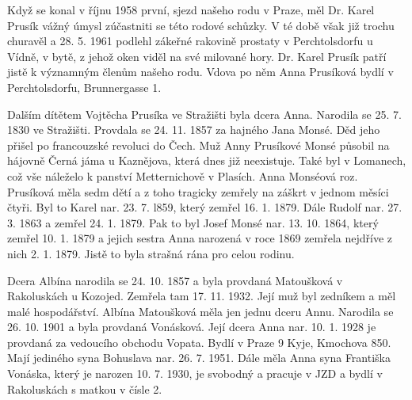 \documentclass[../dejiny-rodu-prusiku.tex]{subfiles}
\begin{document}
Když se konal v říjnu 1958 první, sjezd našeho rodu v Praze, měl Dr. Karel Prusík vážný úmysl zúčastniti se této rodové schůzky. V té době však již trochu churavěl a 28. 5. 1961 podlehl zákeřné rakovině prostaty v Perchtolsdorfu u Vídně, v bytě, z jehož oken viděl na své milované hory. Dr. Karel Prusík patří jistě k významným členům našeho rodu. Vdova po něm Anna Prusíková bydlí v Perchtolsdorfu, Brunnergasse 1.

Dalším dítětem Vojtěcha Prusíka ve Stražišti byla dcera Anna. Narodila se 25. 7. 1830 ve Stražišti. Provdala se 24. 11. 1857 za hajného Jana Monsé. Děd jeho přišel po francouzské revoluci do Čech. Muž Anny Prusíkové Monsé působil na hájovně Černá jáma u Kaznějova, která dnes již neexistuje. Také byl v Lomanech, což vše náleželo k panství Metternichově v Plasích. Anna Monséová roz. Prusíková měla sedm dětí a z toho tragicky zemřely na záškrt v jednom měsíci čtyři. Byl to Karel nar. 23. 7. l859, který zemřel 16. 1. 1879. Dále Rudolf nar. 27. 3. 1863 a zemřel 24. 1. 1879. Pak to byl Josef Monsé nar. 13. 10. 1864, který zemřel 10. 1. 1879 a jejich sestra Anna narozená v roce 1869 zemřela nejdříve z nich 2. 1. 1879. Jistě to byla strašná rána pro celou rodinu.

Dcera Albína narodila se 24. 10. 1857 a byla provdaná Matoušková v Rakoluskách u Kozojed. Zemřela tam 17. 11. 1932. Její muž byl zedníkem a měl malé hospodářství. Albína Matoušková měla jen jednu dceru Annu. Narodila se 26. 10. 1901 a byla provdaná Vonásková. Její dcera Anna nar. 10. 1. 1928 je provdaná za vedoucího obchodu Vopata. Bydlí v Praze 9 Kyje, Kmochova 850. Mají jediného syna Bohuslava nar. 26. 7. 1951. Dále měla Anna syna Františka Vonáska, který je narozen 10. 7. 1930, je svobodný a pracuje v JZD a bydlí v Rakoluskách s matkou v čísle 2.
\end{document}
